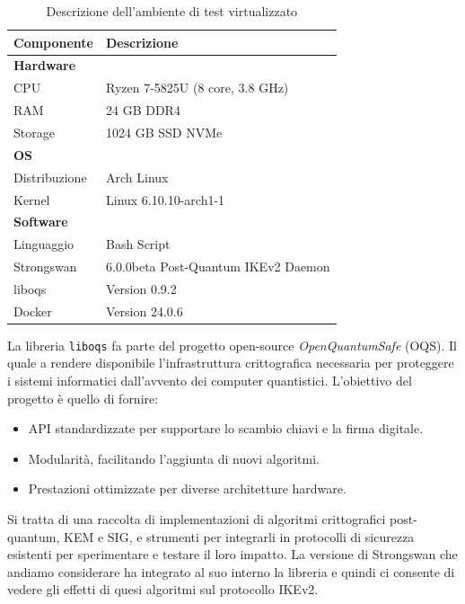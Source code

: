 \begin{table}[htbp] 
    \centering 
    \begin{tabular}{p{4cm} p{8cm}} 
        \toprule
        \textbf{Componente} & \textbf{Descrizione} \\ 
        \midrule
        \textbf{Hardware} & \\ 
        CPU & Ryzen 7-5825U (8 core, 3.8 GHz) \\ 
        RAM & 24 GB DDR4 \\ 
        Storage & 1024 GB SSD NVMe \\ 
        \textbf{OS} & \\ 
        Distribuzione & Arch Linux \\
        Kernel & Linux 6.10.10-arch1-1 \\ 
        \textbf{Software} & \\ 
        Linguaggio & Bash Script \\
        Strongswan & 6.0.0beta Post-Quantum IKEv2 Daemon \\
        liboqs & Version 0.9.2 \\
        Docker & Version 24.0.6 \\ 
        \hline 
    \end{tabular} 
    \caption{Descrizione dell'ambiente di test virtualizzato} 
    \label{tab:env}
\end{table}

\noindent
La libreria \texttt{liboqs} fa parte del progetto open-source \textit{OpenQuantumSafe} (OQS).
Il quale a rendere disponibile l'infrastruttura crittografica necessaria per proteggere i sistemi informatici
dall'avvento dei computer quantistici. L'obiet\-tivo del progetto è quello di fornire:

\begin{itemize}
    \item API standardizzate per supportare lo scambio chiavi e la firma digitale. 
    \item Modularità, facilitando l'aggiunta di nuovi algoritmi. 
    \item Prestazioni ottimizzate per diverse architetture hardware.
\end{itemize}

\noindent
Si tratta di una raccolta di implementazioni di algoritmi crittografici post-quantum, KEM e SIG, e strumenti per integrarli in protocolli di sicurezza esistenti per sperimentare e testare il loro impatto.
La versione di Strongswan che andiamo considerare ha integrato al suo interno la libreria e quindi ci consente di vedere 
gli effetti di quesi algoritmi sul protocollo IKEv2.


